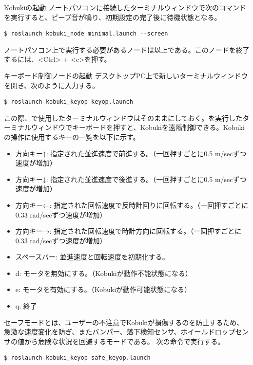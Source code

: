 \begin{itemize}
\circled{\thenum} Kobukiの起動
ノートパソコンに接続したターミナルウィンドウで次のコマンドを実行すると、ビープ音が鳴り、初期設定の完了後に待機状態となる。

\begin{lstlisting}[language=ROS]
$ roslaunch kobuki_node minimal.launch --screen
\end{lstlisting}

ノートパソコン上で実行する必要があるノードは以上である。このノードを終了  するには、<Ctrl> + <c>を押す。

\circled{\thenum} キーボード制御ノードの起動
デスクトップPC上で新しいターミナルウィンドウを開き、次のように入力する。

\begin{lstlisting}[language=ROS]
$ roslaunch kobuki_keyop keyop.launch
\end{lstlisting}

この際、で使用したターミナルウィンドウはそのままにしておく。を実行したターミナルウィンドウでキーボードを押すと、Kobukiを遠隔制御できる。Kobukiの操作に使用するキーの一覧を以下に示す。


\begin{itemize}
\item 方向キー↑: 指定された並進速度で前進する。（一回押すごとに0.5 m/secずつ速度が増加）
\item 方向キー↓: 指定された並進速度で後進する。（一回押すごとに0.5 m/secずつ速度が増加）
\item 方向キー←: 指定された回転速度で反時計回りに回転する。（一回押すごとに0.33 rad/secずつ速度が増加）
\item 方向キー→: 指定された回転速度で時計方向に回転する。（一回押すごとに0.33 rad/secずつ速度が増加）
\item スペースバー: 並進速度と回転速度を初期化する。
\item d: モータを無効にする。（Kobukiが動作不能状態になる）
\item e: モータを有効にする。（Kobukiが動作可能状態になる）
\item q: 終了
\end{itemize}

\begin{exercise}
セーフモードとは、ユーザーの不注意でKobukiが損傷するのを防止するため、急激な速度変化を防ぎ、またバンパー、落下検知センサ、ホイールドロップセンサの値から危険な状況を回避するモードである。  次の命令で実行する。

\begin{lstlisting}[language=ROS]
$ roslaunch kobuki_keyop safe_keyop.launch
\end{lstlisting}


\end{exercise}
\end{itemize}
